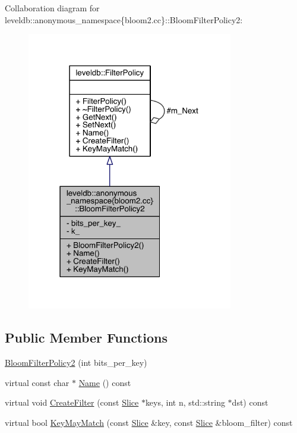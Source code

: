 Collaboration diagram for leveldb\+:\+:anonymous\+\_\+namespace\{bloom2.\+cc\}\+:\+:Bloom\+Filter\+Policy2\+:
\nopagebreak
\begin{figure}[H]
\begin{center}
\leavevmode
\includegraphics[width=255pt]{classleveldb_1_1anonymous__namespace_02bloom2_8cc_03_1_1_bloom_filter_policy2__coll__graph}
\end{center}
\end{figure}
\subsection*{Public Member Functions}
\begin{DoxyCompactItemize}
\item 
\hyperlink{classleveldb_1_1anonymous__namespace_02bloom2_8cc_03_1_1_bloom_filter_policy2_ab8bfe9b7266ee78cbcecee7bd42d2a7c}{Bloom\+Filter\+Policy2} (int bits\+\_\+per\+\_\+key)
\item 
virtual const char $\ast$ \hyperlink{classleveldb_1_1anonymous__namespace_02bloom2_8cc_03_1_1_bloom_filter_policy2_a84bb9dc34a98128dc57781281d2544c2}{Name} () const 
\item 
virtual void \hyperlink{classleveldb_1_1anonymous__namespace_02bloom2_8cc_03_1_1_bloom_filter_policy2_a3c1dd845ce1833b6ab67451c5dd73a72}{Create\+Filter} (const \hyperlink{classleveldb_1_1_slice}{Slice} $\ast$keys, int n, std\+::string $\ast$dst) const 
\item 
virtual bool \hyperlink{classleveldb_1_1anonymous__namespace_02bloom2_8cc_03_1_1_bloom_filter_policy2_acdc88e2aa9880e1650d7ae8b5378e502}{Key\+May\+Match} (const \hyperlink{classleveldb_1_1_slice}{Slice} \&key, const \hyperlink{classleveldb_1_1_slice}{Slice} \&bloom\+\_\+filter) const 
\end{DoxyCompactItemize}
